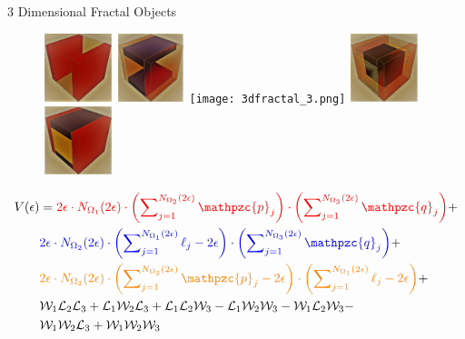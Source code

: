 \documentclass{beamer}
\newcommand{\SL}{\mathcal{L}}
\newcommand{\W}{\mathcal{W}}
\newcommand{\p}{\mathpzc{p}}
\newcommand{\q}{\mathpzc{q}}
\begin{document}
\begin{frame}{3 Dimensional Fractal Objects}

        \begin{figure}
            \includegraphics[height=2cm,width=2cm]{3dfractal_1.png}
            \hfill
            \includegraphics[height=2cm,width=2cm]{3dfractal_2.png}
            \hfill
            \texttt{[image: 3dfractal\_3.png]}
            \hfill
            \includegraphics[height=2cm,width=2cm]{3dfractal_4.png}
            \hfill
            \includegraphics[height=2cm,width=2cm]{3dfractal_5}
        \end{figure}
        
        \begin{align*}
V(\epsilon) &= \textcolor{red}{2\epsilon\cdot N_{\Omega_1}(2\epsilon) \cdot \left( \sum\nolimits_{j=1}^{{N_{\Omega_2}}(2\epsilon)}\p_j \right) \cdot \left( \sum\nolimits_{j=1}^{{N_{\Omega_3}}(2\epsilon)}\q_j \right)} +\\
 &\textcolor{blue}{2\epsilon\cdot N_{\Omega_2}(2\epsilon) \cdot \left( \sum\nolimits_{j=1}^{{N_{\Omega_1}}(2\epsilon)}\ell_j - 2\epsilon \right) \cdot \left( \sum\nolimits_{j=1}^{{N_{\Omega_3}}(2\epsilon)}\q_j \right)} + \\
&\textcolor{orange}{2\epsilon\cdot N_{\Omega_3}(2\epsilon) \cdot \left( \sum\nolimits_{j=1}^{{N_{\Omega_2}}(2\epsilon)}\p_j - 2\epsilon \right) \cdot \left( \sum\nolimits_{j=1}^{{N_{\Omega_1}}(2\epsilon)}\ell_j - 2\epsilon \right)} + \\
&\W_1\SL_2\SL_3 + \SL_1\W_2\SL_3 + \SL_1\SL_2\W_3 - \SL_1\W_2\W_3 - \W_1\SL_2\W_3 - \\
&\W_1\W_2\SL_3 + \W_1\W_2\W_3 
	\end{align*}
	
\end{frame}
\end{document}
